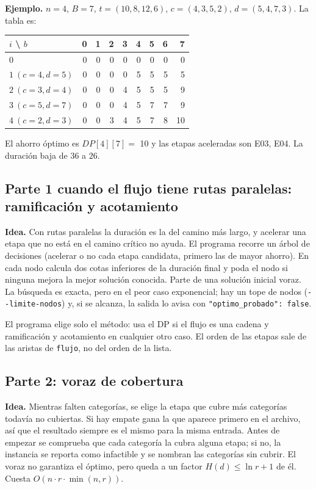 \documentclass[11pt,a4paper]{article}
\begin{document}
\textbf{Ejemplo.} $n=4$, $B=7$, $t=(10,8,12,6)$, $c=(4,3,5,2)$, $d=(5,4,7,3)$. La tabla es:

\begin{center}
\small
\begin{tabular}{@{}lrrrrrrrr@{}}
\toprule
$i$ \textbackslash{} $b$ & 0 & 1 & 2 & 3 & 4 & 5 & 6 & 7 \\
\midrule
$0$ & 0 & 0 & 0 & 0 & 0 & 0 & 0 & 0 \\
$1\ (c=4,d=5)$ & 0 & 0 & 0 & 0 & 5 & 5 & 5 & 5 \\
$2\ (c=3,d=4)$ & 0 & 0 & 0 & 4 & 5 & 5 & 5 & 9 \\
$3\ (c=5,d=7)$ & 0 & 0 & 0 & 4 & 5 & 7 & 7 & 9 \\
$4\ (c=2,d=3)$ & 0 & 0 & 3 & 4 & 5 & 7 & 8 & 10 \\
\bottomrule
\end{tabular}
\end{center}

El ahorro óptimo es $DP[4][7]=$ 10 y las etapas aceleradas son E03, E04. La duración baja de $36$ a $26$.

\subsection{Parte 1 cuando el flujo tiene rutas paralelas: ramificación y acotamiento}

\textbf{Idea.} Con rutas paralelas la duración es la del camino más largo, y acelerar una etapa que no está en el camino crítico no ayuda. El programa recorre un árbol de decisiones (acelerar o no cada etapa candidata, primero las de mayor ahorro). En cada nodo calcula dos cotas inferiores de la duración final y poda el nodo si ninguna mejora la mejor solución conocida. Parte de una solución inicial voraz. La búsqueda es exacta, pero en el peor caso exponencial; hay un tope de nodos (\texttt{-{}-limite-nodos}) y, si se alcanza, la salida lo avisa con \texttt{"optimo\_probado": false}.

El programa elige solo el método: usa el DP si el flujo es una cadena y ramificación y acotamiento en cualquier otro caso. El orden de las etapas sale de las aristas de \texttt{flujo}, no del orden de la lista.

\subsection{Parte 2: voraz de cobertura}

\textbf{Idea.} Mientras falten categorías, se elige la etapa que cubre más categorías todavía no cubiertas. Si hay empate gana la que aparece primero en el archivo, así que el resultado siempre es el mismo para la misma entrada. Antes de empezar se comprueba que cada categoría la cubra alguna etapa; si no, la instancia se reporta como infactible y se nombran las categorías sin cubrir. El voraz no garantiza el óptimo, pero queda a un factor $H(d)\le\ln r+1$ de él. Cuesta $O(n\cdot r\cdot\min(n,r))$.
\end{document}
